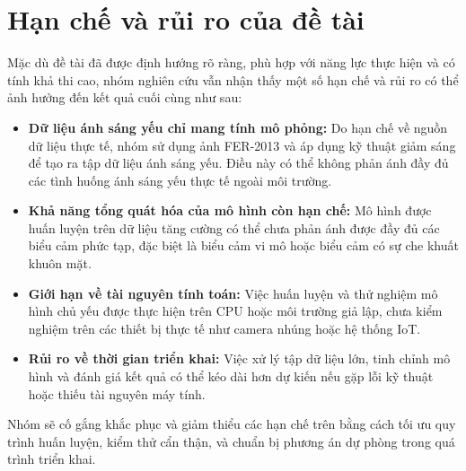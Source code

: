 \section{Hạn chế và rủi ro của đề tài} %

Mặc dù đề tài đã được định hướng rõ ràng, phù hợp với năng lực thực hiện và có tính khả thi cao, nhóm nghiên cứu vẫn nhận thấy một số hạn chế và rủi ro có thể ảnh hưởng đến kết quả cuối cùng như sau:

\begin{itemize}
    \item \textbf{Dữ liệu ánh sáng yếu chỉ mang tính mô phỏng:} Do hạn chế về nguồn dữ liệu thực tế, nhóm sử dụng ảnh FER-2013 và áp dụng kỹ thuật giảm sáng để tạo ra tập dữ liệu ánh sáng yếu. Điều này có thể không phản ánh đầy đủ các tình huống ánh sáng yếu thực tế ngoài môi trường.

    \item \textbf{Khả năng tổng quát hóa của mô hình còn hạn chế:} Mô hình được huấn luyện trên dữ liệu tăng cường có thể chưa phản ánh được đầy đủ các biểu cảm phức tạp, đặc biệt là biểu cảm vi mô hoặc biểu cảm có sự che khuất khuôn mặt.

    \item \textbf{Giới hạn về tài nguyên tính toán:} Việc huấn luyện và thử nghiệm mô hình chủ yếu được thực hiện trên CPU hoặc môi trường giả lập, chưa kiểm nghiệm trên các thiết bị thực tế như camera nhúng hoặc hệ thống IoT.

    \item \textbf{Rủi ro về thời gian triển khai:} Việc xử lý tập dữ liệu lớn, tinh chỉnh mô hình và đánh giá kết quả có thể kéo dài hơn dự kiến nếu gặp lỗi kỹ thuật hoặc thiếu tài nguyên máy tính.
\end{itemize}

Nhóm sẽ cố gắng khắc phục và giảm thiểu các hạn chế trên bằng cách tối ưu quy trình huấn luyện, kiểm thử cẩn thận, và chuẩn bị phương án dự phòng trong quá trình triển khai.